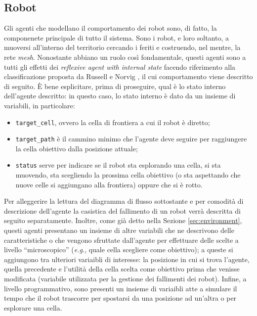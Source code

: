 \subsection{Robot}
\label{sub:robots}
Gli agenti che modellano il comportamento dei robot sono, di fatto, la componenete principale di tutto il sistema.
Sono i robot, e loro soltanto, a muoversi all'interno del territorio cercando i feriti e costruendo, nel mentre, la rete \textit{mesh}. 
Nonostante abbiano un ruolo così fondamentale, questi agenti sono a tutti gli effetti dei \textit{reflexive agent with internal state} facendo riferimento alla classificazione proposta da Russell e Norvig \cite{russell2016}, il cui comportamento viene descritto di seguito.
È bene esplicitare, prima di proseguire, qual è lo stato interno dell'agente descritto: in questo caso, lo stato interno è dato da un insieme di variabili, in particolare:
\begin{itemize}
	\item \texttt{target\_cell}, ovvero la cella di frontiera a cui il robot è diretto;
	\item \texttt{target\_path} è il cammino minimo che l'agente deve seguire per raggiungere la cella obiettivo dalla posizione attuale;
	\item \texttt{status} serve per indicare se il robot sta esplorando una cella, si sta muovendo, sta scegliendo la prossima cella obiettivo (o sta aspettando che nuove celle si aggiungano alla frontiera) oppure che si è rotto.
\end{itemize}
Per alleggerire la lettura del diagramma di flusso sottostante e per comodità di descrizione dell'agente la casistica del fallimento di un robot verrà descritta di seguito separatamente.
Inoltre, come già detto nella Sezione \ref{sec:environment}, questi agenti presentano un insieme di altre variabili che ne descrivono delle caratteristiche o che vengono sfruttate dall'agente per effettuare delle scelte a livello “microscopico” (\textit{e.g.}, quale cella scegliere come obiettivo); a queste si aggiungono tra ulteriori variaibli di interesse: la posizione in cui si trova l'agente, quella precedente e l'utilità della cella scelta come obiettivo prima che venisse modificata (variabile utilizzata per la gestione dei fallimenti dei robot).
Infine, a livello programmativo, sono presenti un insieme di variaibli atte a simulare il tempo che il robot trascorre per spostarsi da una posizione ad un'altra o per esplorare una cella. 

